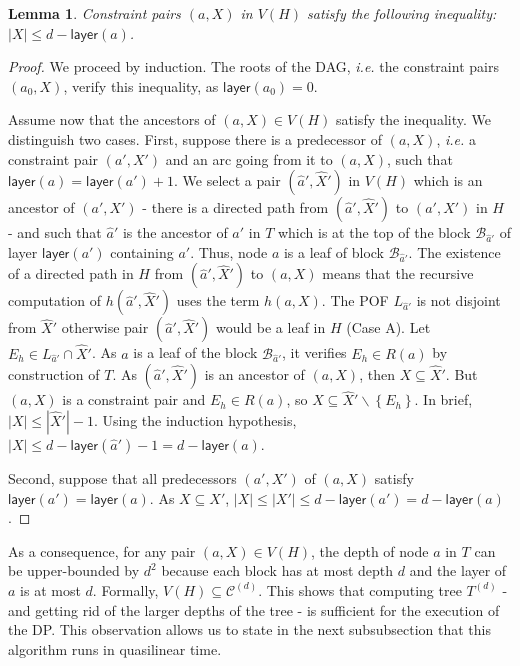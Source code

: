 \documentclass{article}
\newtheorem{lemma}{Lemma}
\newcommand{\set}[1]{\left\{ #1 \right\}}
\newcommand{\card}[1]{\left| #1 \right|}
\begin{document}
\begin{lemma}
Constraint pairs $(a,X)$ in $V(H)$ satisfy the following inequality: $\card{X}\le d-\textsf{layer}(a)$.
\label{le:layer_inequality}
\end{lemma}
\begin{proof}
We proceed by induction. The roots of the DAG, {\em i.e.} the constraint pairs $(a_0,X)$, verify this inequality, as $\textsf{layer}(a_0) = 0$. 

Assume now that the ancestors of $(a,X) \in V(H)$ satisfy the inequality. We distinguish two cases. First, suppose there is a predecessor of $(a,X)$, {\em i.e.} a constraint pair $(a',X')$ and an arc going from it to $(a,X)$, such that $\textsf{layer}(a) = \textsf{layer}(a')+1$. We select a pair $(\widehat{a}',\widehat{X}')$ in $V(H)$ which is an ancestor of $(a',X')$ - there is a directed path from  $(\widehat{a}',\widehat{X}')$ to $(a',X')$ in $H$ - and such that $\widehat{a}'$ is the ancestor of $a'$ in $T$ which is at the top of the block $\mathcal{B}_{\widehat{a}'}$ of layer $\textsf{layer}(a')$ containing $a'$. Thus, node $a$ is a leaf of block $\mathcal{B}_{\widehat{a}'}$. The existence of a directed path in $H$ from $(\widehat{a}',\widehat{X}')$ to $(a,X)$ means that the recursive computation of $h(\widehat{a}',\widehat{X}')$ uses the term $h(a,X)$. The POF $L_{\widehat{a}'}$ is not disjoint from $\widehat{X}'$ otherwise pair $(\widehat{a}',\widehat{X}')$ would be a leaf in $H$ (Case A). Let $E_h \in L_{\widehat{a}'} \cap \widehat{X}'$. As $a$ is a leaf of the block $\mathcal{B}_{\widehat{a}'}$, it verifies $E_h \in R(a)$ by construction of $T$. As $(\widehat{a}',\widehat{X}')$ is an ancestor of $(a,X)$, then $X \subseteq \widehat{X}'$. But $(a,X)$ is a constraint pair and $E_h \in R(a)$, so $X \subseteq \widehat{X}'\backslash \set{E_h}$. In brief, $\card{X} \le \card{\widehat{X}'} - 1$. Using the induction hypothesis, $\card{X} \le d-\textsf{layer}(\widehat{a}')-1 = d-\textsf{layer}(a)$.

Second, suppose that all predecessors $(a',X')$ of $(a,X)$ satisfy $\textsf{layer}(a') = \textsf{layer}(a)$. As $X \subseteq X'$, $\card{X}\le \card{X'} \le d-\textsf{layer}(a') = d-\textsf{layer}(a)$. 
\end{proof}

As a consequence, for any pair $(a,X) \in V(H)$, the depth of node $a$ in $T$ can be upper-bounded by $d^2$ because each block has at most depth $d$ and the layer of $a$ is at most $d$. Formally, $V(H) \subseteq \mathcal{C}^{(d)}$. This shows that computing tree $T^{(d)}$ - and getting rid of the larger depths of the tree - is sufficient for the execution of the DP. This observation allows us to state in the next subsubsection that this algorithm runs in quasilinear time.
\end{document}
